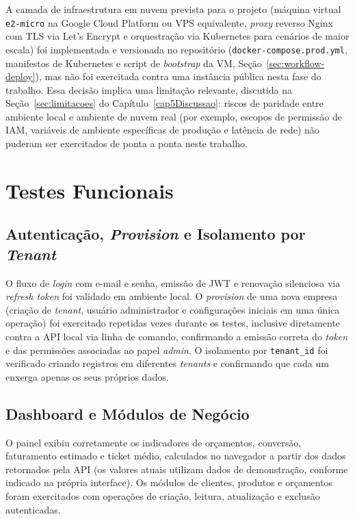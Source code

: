 A camada de infraestrutura em nuvem prevista para o projeto (máquina virtual \texttt{e2-micro} na Google Cloud Platform ou VPS equivalente, \textit{proxy} reverso Nginx com TLS via Let's Encrypt e orquestração via Kubernetes para cenários de maior escala) foi implementada e versionada no repositório (\texttt{docker-compose.prod.yml}, manifestos de Kubernetes e script de \textit{bootstrap} da VM, Seção~\ref{sec:workflow-deploy}), mas não foi exercitada contra uma instância pública nesta fase do trabalho. Essa decisão implica uma limitação relevante, discutida na Seção~\ref{sec:limitacoes} do Capítulo~\ref{cap5Discussao}: riscos de paridade entre ambiente local e ambiente de nuvem real (por exemplo, escopos de permissão de IAM, variáveis de ambiente específicas de produção e latência de rede) não puderam ser exercitados de ponta a ponta neste trabalho.

\section{Testes Funcionais}
\label{sec:testes-funcionais}

\subsection{Autenticação, \textit{Provision} e Isolamento por \textit{Tenant}}

O fluxo de \textit{login} com e-mail e senha, emissão de JWT e renovação silenciosa via \textit{refresh token} foi validado em ambiente local. O \textit{provision} de uma nova empresa (criação de \textit{tenant}, usuário administrador e configurações iniciais em uma única operação) foi exercitado repetidas vezes durante os testes, inclusive diretamente contra a API local via linha de comando, confirmando a emissão correta do \textit{token} e das permissões associadas ao papel \textit{admin}. O isolamento por \texttt{tenant\_id} foi verificado criando registros em diferentes \textit{tenants} e confirmando que cada um enxerga apenas os seus próprios dados.

\subsection{Dashboard e Módulos de Negócio}

O painel exibiu corretamente os indicadores de orçamentos, conversão, faturamento estimado e ticket médio, calculados no navegador a partir dos dados retornados pela API (os valores atuais utilizam dados de demonstração, conforme indicado na própria interface). Os módulos de clientes, produtos e orçamentos foram exercitados com operações de criação, leitura, atualização e exclusão autenticadas.

